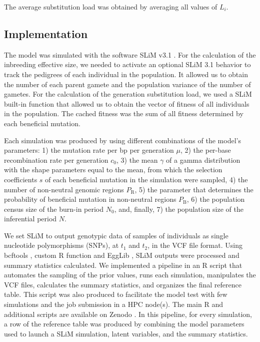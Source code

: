\documentclass[a4paper, 12pt]{article}
\begin{document}
\noindent The average substitution load was obtained by averaging all values of $L_{i}$.

\subsection*{Implementation}

The model was simulated with the software SLiM v3.1 \citep{Haller:2017gm, Haller:2019fd}. For the calculation of the inbreeding effective size, we needed to activate an optional SLiM 3.1 behavior to track the pedigrees of each individual in the population. It allowed us to obtain the number of each parent gamete and the population variance of the number of gametes. For the calculation of the generation substitution load, we used a SLiM built-in function that allowed us to obtain the vector of fitness of all individuals in the population. The cached fitness was the sum of all fitness determined by each beneficial mutation. 

Each simulation was produced by using different combinations of the model's parameters: 1) the mutation rate per bp per generation $\mu$, 2) the per-base recombination rate per generation $c_{\mathrm{0}}$, 3) the mean $\gamma$ of a gamma distribution with the shape parameters equal to the mean, from which the selection coefficients $s$ of each beneficial mutation in the simulation were sampled, 4) the number of non-neutral genomic regions $P_\mathrm{R}$, 5) the parameter that determines the probability of beneficial mutation in non-neutral regions $P_\mathrm{B}$, 6) the population census size of the burn-in period $N_\mathrm{0}$, and, finally, 7) the population size of the inferential period $N$.

We set SLiM to output genotypic data of samples of individuals as single nucleotide polymorphisms (SNPs), at $t_1$ and $t_2$, in the VCF file format. Using bcftools \citep{Li:2011kr}, custom R function \citep{Rcore} and EggLib \citep{DeMita:2012dx}, SLiM outputs were processed and summary statistics calculated. We implemented a pipeline in an R script that automates the sampling of the prior values, runs each simulation, manipulates the VCF files, calculates the summary statistics, and organizes the final reference table. This script was also produced to facilitate the model test with few simulations and the job submission in a HPC node(s). The main R and additional scripts are available on Zenodo \citep{Pavinato:2021}. In this pipeline, for every simulation, a row of the reference table was produced by combining the model parameters used to launch a SLiM simulation, latent variables, and the summary statistics. 
\end{document}
